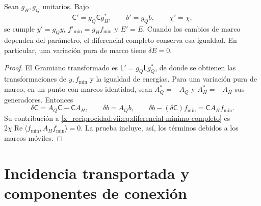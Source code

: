 \begin{proposition}
\label{x_reciprocidad:vii:prop:covariancia-minimo}
Sean \(g_H,g_Q\) unitarios. Bajo
\[
 \mathsf C'=g_Q\mathsf C g_H^*,\qquad b'=g_Qb,\qquad \chi'=\chi,
\]
se cumple \(y'=g_Qy\), \(f'_{\min}=g_Hf_{\min}\) y \(E'=E\).
Cuando los cambios de marco dependen del parámetro, el diferencial
completo conserva esa igualdad. En particular, una variación pura de
marco tiene \(\delta E=0\).
\end{proposition}

\begin{proof}
El Gramiano transformado es \(\mathsf L'=g_Q\mathsf Lg_Q^*\),
de donde se obtienen las transformaciones de \(y,f_{\min}\) y
la igualdad de energías. Para una variación pura de marco, en un punto
con marcos identidad, sean \(A_Q^*=-A_Q\) y \(A_H^*=-A_H\)
sus generadores. Entonces
\[
 \delta\mathsf C=A_Q\mathsf C-\mathsf C A_H,\qquad
 \delta b=A_Qb,\qquad
 \delta b-(\delta\mathsf C)f_{\min}=\mathsf C A_Hf_{\min}.
\]
Su contribución a \eqref{x_reciprocidad:vii:eq:diferencial-minimo-completo} es
\(2\chi\operatorname{Re}\langle f_{\min},A_Hf_{\min}\rangle=0\).
La prueba incluye, así, los términos debidos a los marcos móviles.
\end{proof}

\section{Incidencia transportada y componentes de conexión}
\label{x_reciprocidad:vii:subsec:incidencia-conexion-minima}

